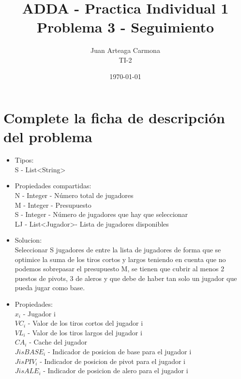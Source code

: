 \documentclass[a4paper,12pt]{article}
\title{ADDA - Practica Individual 1\\ Problema 3 - Seguimiento}
\author{Juan Arteaga Carmona\\TI-2}
\date{\today}
\begin{document}
\maketitle

\section{Complete la ficha de descripción del problema}


\begin{itemize}
 \item Tipos:\\
 S - List\textless String\textgreater \\%

 \item Propiedades compartidas:\\
 N - Integer - Número total de jugadores\\
 M - Integer - Presupuesto\\
 S - Integer - Número de jugadores que hay que seleccionar\\
 LJ - List\textless Jugador\textgreater - Lista de jugadores disponibles\\
 \item Solucion:\\
Seleccionar S jugadores de entre la lista de jugadores de forma que se optimice
la suma de los tiros cortos y largos teniendo en cuenta que no podemos sobrepasar el presupuesto M, se tienen que cubrir
 al menos 2 puestos de pivots, 3 de aleros y que debe de haber tan solo un jugador
 que pueda jugar como base.


\item Propiedades:\\
\begin{math}
 x_i
\end{math}
- Jugador i\\
\begin{math}
VC_i
\end{math}
- Valor de los tiros cortos del jugador i\\
\begin{math}
VL_i
\end{math}
- Valor de los tiros largos del jugador i\\
 \begin{math}
CA_i
 \end{math}
 - Cache del jugador\\
 \begin{math}
JisBASE_i
 \end{math}
 - Indicador de posicion de base para el jugador i\\
 \begin{math}
JisPIV_i
 \end{math}
 - Indicador de posicion de pivot para el jugador i\\
 \begin{math}
JisALE_i
 \end{math}
 - Indicador de posicion de alero para el jugador i\\



\end{itemize}
\end{document}
